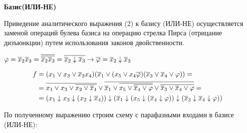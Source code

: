 \begin{center}
  \textbf{Базис(ИЛИ-НЕ)}
\end{center}

Приведение аналитического выражения (2) к базису (ИЛИ-НЕ) осуществляется заменой операций булева базиса на операцию стрелка Пирса (отрицание дизъюнкции) путем использования законов двойственности. 

$
\varphi = \overline{x}_{2}\overline{x}_{3}= \overline{\overline{\overline{x}_{2}\overline{x}_{3}}}= \overline{\overline{x}_{2}\downarrow\overline{x}_{3}} \rightarrow \overline{\varphi} = \overline{x}_{2}\downarrow\overline{x}_{3} 
$

\begin{align*}
f &= (x_{1}\vee x_{3}\vee\overline{x}_{2}x_{4})(\overline{x}_{1}\vee(x_{5}\vee x_{4}\overline{\varphi})(\overline{x}_{3} \vee \overline{x}_{4} \vee \varphi)) = \\
  &=\overline{ x_{1}\vee x_{3}\vee \overline{x_{2}\vee\overline{x}_{4}} }
    \vee
    \overline{
      \overline{x}_{1} \vee
      \overline{ x_{5} \vee \overline{\overline{x}_{4}\vee\varphi}} \vee
      \overline{ \overline{x}_{3} \vee \overline{x}_{4} \vee \varphi   }
    } = \\
  &=(x_{1}\downarrow x_{3}\downarrow (x_{2}\downarrow\overline{x}_{4}))
    \downarrow
    (\overline{x}_{1} \downarrow
      (x_{5} \downarrow (\overline{x}_{4}\downarrow\varphi)) 
      \downarrow
      (\overline{x}_{3} \downarrow \overline{x}_{4} \downarrow \varphi)
    )
\end{align*}

По полученному выражению строим схему с парафазными входами в базисе (ИЛИ-НЕ):
